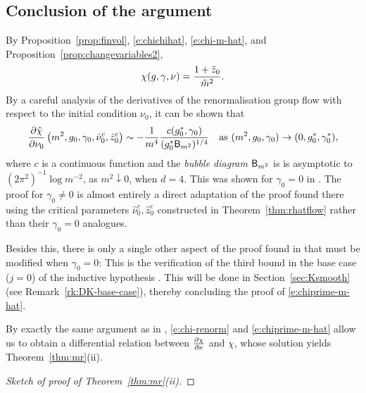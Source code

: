 \subsection{Conclusion of the argument}
\label{sec:suscept-conc}

By Proposition~\ref{prop:finvol}, \eqref{e:chichihat}, \eqref{e:chi-m-hat},
and Proposition~\ref{prop:changevariables2},
\begin{equation}
\label{e:chi-renorm}
\chi(g, \gamma, \nu)
	=
\frac{1 + \tilde z_0}{\tilde m^2}.
\end{equation}
By a careful analysis of the derivatives of the renormalisation group flow with
respect to the initial condition $\nu_0$, it can be shown that
\begin{equation}
\label{e:chiprime-m-hat}
\frac{\partial \hat\chi}{\partial \nu_0} \left(m^2,g_0, \gamma_0,\hat\nu_0^c, \hat z_0^c \right)
	\sim
-\frac{1}{m^4} \frac{c(g_0^*, \gamma_0)}{(g_0^*{\sf B}_{m^2})^{1/4}}
	\quad
\text{as $(m^2,g_0,\gamma_0) \rightarrow (0,g_0^*,\gamma_0^*)$},
\end{equation}
where $c$ is a continuous function and the \emph{bubble diagram} ${\sf B}_{m^2}$ is
is asymptotic to $(2\pi^2)^{-1} \log m^{-2}$, as $m^2 \downarrow 0$, when $d = 4$.
This was shown for $\gamma_0 = 0$ in \cite[Section~\ref{sec:pfmr}]{BBS-saw4-log}.
The proof for $\gamma_0 \ne 0$ is almost entirely a direct adaptation of the proof
found there using the critical parameters $\hat\nu_0^c, \hat z_0^c$ constructed
in Theorem~\ref{thm:rhatflow} rather than their $\gamma_0 = 0$ analogues.

Besides this, there is only a single other aspect of the proof found in \cite{BBS-saw4-log}
that must be modified when $\gamma_0 = 0$: This is the verification of the third bound
in the base case ($j = 0$) of the inductive hypothesis \cite[\eqref{log-e:induct1}]{BBS-saw4-log}.
This will be done in Section~\ref{sec:Ksmooth} (see Remark~\ref{rk:DK-base-case}),
thereby concluding the proof of \eqref{e:chiprime-m-hat}.

By exactly the same argument as in \cite[Section~\ref{log-sec:pfsuscept}]{BBS-saw4-log},
\eqref{e:chi-renorm} and \eqref{e:chiprime-m-hat} allow us to obtain
a differential relation between $\frac{\partial \chi}{\partial \nu}$ and $\chi$,
whose solution yields Theorem~\ref{thm:mr}(ii).

\begin{proof}[Sketch of proof of Theorem~\ref{thm:mr}(ii)]
\end{proof}

